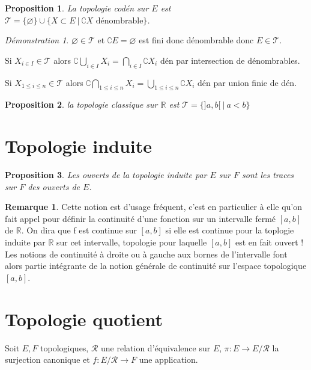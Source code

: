 \documentclass[a4paper, 11pt, french]{book}
\newenvironment{itemise}{\itemize}{\enditemize}
\theoremstyle{plain} %
\newtheorem{proposition}{Proposition}
\theoremstyle{definition} %
\newtheorem{remarque}{Remarque}
\theoremstyle{remark} %
\newtheorem*{demonstration}{Démonstration}
\newcommand{\1}{\mathds{1}}
\newcommand\vide{\varnothing}
\newcommand{\infegal}{\leqslant}
\newcommand{\R}{\mathbb{R}}
\newcommand\ens[2]{\{#1 \ |\ #2\}}
\begin{document}
\begin{proposition}
	La topologie codén sur $E$ est $\mathscr{T}=\{\vide\}\cup\ens{X\subset E}{\complement X\text{ dénombrable}}$.
\end{proposition}

\begin{demonstration}
	\begin{itemise}
		\item $\vide\in\mathscr{T}$ et $\complement E=\vide$ est fini donc dénombrable donc $E\in\mathscr{T}$.
		\item Si $X_{i\in I}\in\mathscr{T}$ alors $\complement\bigcup_{i\in I}X_i=\bigcap_{i\in I}\complement X_i$ dén par intersection de dénombrables.
		\item Si $X_{1\infegal i\infegal n}\in\mathscr{T}$ alors $\complement\bigcap_{1\infegal i\infegal n}X_i=\bigcup_{1\infegal i\infegal n}\complement X_i$ dén par union finie de dén.
	\end{itemise}
\end{demonstration}

\begin{proposition}
	la topologie classique sur $\R$ est $\mathscr{T}=\ens{]a, b[}{a<b}$
\end{proposition}

\section{Topologie induite}

\begin{proposition}
	Les ouverts de la topologie induite par $E$ sur $F$ sont les traces sur $F$ des ouverts de $E$.
\end{proposition}

\begin{remarque}
	Cette notion est d’usage fréquent, c’est en particulier à elle qu’on fait appel pour définir la continuité d’une fonction sur un intervalle fermé $[a, b]$ de $\R$.
	On dira que f est continue sur $[a, b]$ si elle est continue pour la toplogie induite par $\R$ sur cet intervalle, topologie pour laquelle $[a, b]$ est en fait ouvert !
	Les notions de continuité à droite ou à gauche aux bornes de l’intervalle font alors partie intégrante de la notion générale de continuité sur l’espace topologique $[a, b]$.
\end{remarque}

\section{Topologie quotient}
Soit $E, F$ topologiques, $\mathcal{R}$ une relation d’équivalence sur $E$, $\pi\colon E\rightarrow E/\mathcal{R}$ la surjection canonique et $f\colon E/\mathcal{R}\rightarrow F$ une application.
\end{document}
